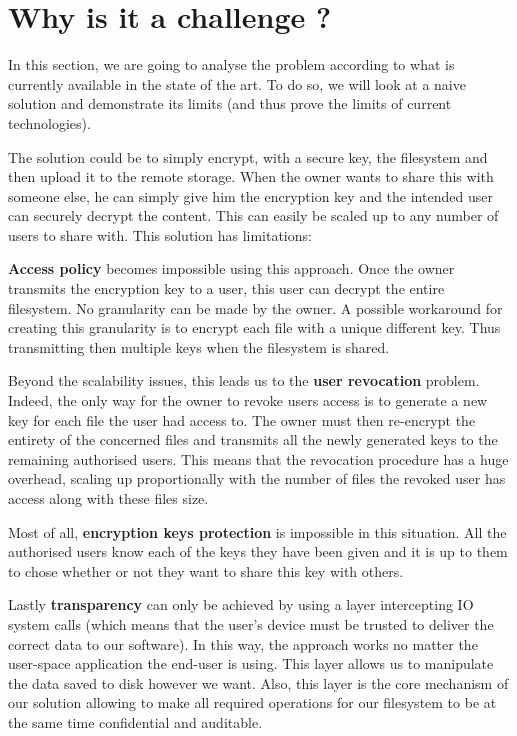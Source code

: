 \documentclass[../main.tex]{subfiles}
\begin{document}
\section{Why is it a challenge ?}
\label{section:problem:why_a_challenge}

\par In this section, we are going to analyse the problem according to what is currently available in the state of the art. To do so, we will look at a naive solution and demonstrate its limits (and thus prove the limits of current technologies).
\par The solution could be to simply encrypt, with a secure key, the filesystem and then upload it to the remote storage. When the owner wants to share this with someone else, he can simply give him the encryption key and the intended user can securely decrypt the content. This can easily be scaled up to any number of users to share with. This solution has limitations:
\par \textbf{Access policy} becomes impossible using this approach. Once the owner transmits the encryption key to a user, this user can decrypt the entire filesystem. No granularity can be made by the owner. A possible workaround for creating this granularity is to encrypt each file with a unique different key. Thus transmitting then multiple keys when the filesystem is shared.
\par Beyond the scalability issues, this leads us to the \textbf{user revocation} problem. Indeed, the only way for the owner to revoke users access is to generate a new key for each file the user had access to. The owner must then re-encrypt the entirety of the concerned files and transmits all the newly generated keys to the remaining authorised users. This means that the revocation procedure has a huge overhead, scaling up proportionally with the number of files the revoked user has access along with these files size.
\par Most of all, \textbf{encryption keys protection} is impossible in this situation. All the authorised users know each of the keys they have been given and it is up to them to chose whether or not they want to share this key with others.
\par Lastly \textbf{transparency} can only be achieved by using a layer intercepting IO system calls (which means that the user's device must be trusted to deliver the correct data to our software). In this way, the approach works no matter the user-space application the end-user is using. This layer allows us to manipulate the data saved to disk however we want. Also, this layer is the core mechanism of our solution allowing to make all required operations for our filesystem to be at the same time confidential and auditable.
\end{document}
